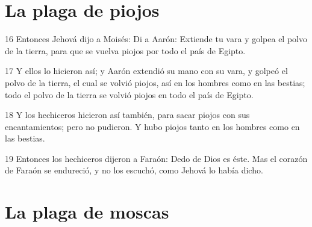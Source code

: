 \section*{La plaga de piojos}

\par 16 Entonces Jehová dijo a Moisés: Di a Aarón: Extiende tu vara y golpea el polvo de la tierra, para que se vuelva piojos por todo el país de Egipto.
\par 17 Y ellos lo hicieron así; y Aarón extendió su mano con su vara, y golpeó el polvo de la tierra, el cual se volvió piojos, así en los hombres como en las bestias; todo el polvo de la tierra se volvió piojos en todo el país de Egipto.
\par 18 Y los hechiceros hicieron así también, para sacar piojos con sus encantamientos; pero no pudieron. Y hubo piojos tanto en los hombres como en las bestias.
\par 19 Entonces los hechiceros dijeron a Faraón: Dedo de Dios es éste. Mas el corazón de Faraón se endureció, y no los escuchó, como Jehová lo había dicho.

\section*{La plaga de moscas}

